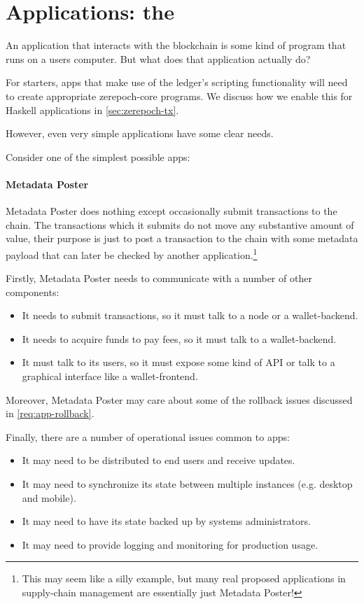 \section{Applications: the }
\label{sec:paf}

An application that interacts with the blockchain is some kind of program that runs on a users computer.
But what does that application actually do?

For starters, \glspl{app} that make use of the ledger's scripting functionality will need to create appropriate \gls{zerepoch-core} programs.
We discuss how we enable this for Haskell applications in \cref{sec:zerepoch-tx}.

However, even very simple applications have some clear needs.

Consider one of the simplest possible \glspl{app}:

\paragraph{Metadata Poster}
Metadata Poster does nothing except occasionally submit transactions to the chain.
The transactions which it submits do not move any substantive amount of value, their purpose is just to post a transaction to the chain with some metadata payload that can later be checked by another application.\footnote{
This may seem like a silly example, but many real proposed applications in supply-chain management are essentially just Metadata Poster!
}
\medskip

Firstly, Metadata Poster needs to communicate with a number of other components:
\begin{itemize}
\item It needs to submit transactions, so it must talk to a \gls{node} or a \gls{wallet-backend}.
\item It needs to acquire funds to pay fees, so it must talk to a \gls{wallet-backend}.
\item It must talk to its users, so it must expose some kind of API or talk to a graphical interface like a \gls{wallet-frontend}.
\end{itemize}

Moreover, Metadata Poster may care about some of the rollback issues discussed in \cref{req:app-rollback}.

Finally, there are a number of operational issues common to \glspl{app}:
\begin{itemize}
\item It may need to be distributed to end users and receive updates.
\item It may need to synchronize its state between multiple instances (e.g. desktop and mobile).
\item It may need to have its state backed up by systems administrators.
\item It may need to provide logging and monitoring for production usage.
\end{itemize}

